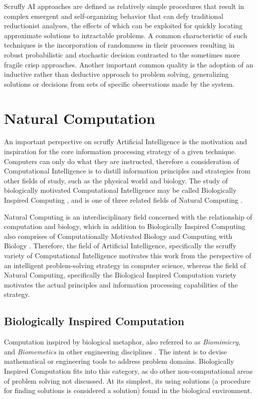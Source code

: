 \documentclass[a4paper, 11pt]{article}
\begin{document}
Scruffy AI approaches are defined as relatively simple procedures that result in complex emergent and self-organizing behavior that can defy traditional reductionist analyses, the effects of which can be exploited for quickly locating approximate solutions to intractable problems. A common characteristic of such techniques is the incorporation of randomness in their processes resulting in robust probabilistic and stochastic decision contrasted to the sometimes more fragile crisp approaches. Another important common quality is the adoption of an inductive rather than deductive approach to problem solving, generalizing solutions or decisions from sets of specific observations made by the system.

% 
% 
\section{Natural Computation}
\label{sec:natural_computation}
An important perspective on scruffy Artificial Intelligence is the motivation and inspiration for the core information processing strategy of a given technique. Computers can only do what they are instructed, therefore a consideration of Computational Intelligence is to distill information principles and strategies from other fields of study, such as the physical world and biology. The study of biologically motivated Computational Intelligence may be called Biologically Inspired Computing \cite{Castro2005a}, and is one of three related fields of Natural Computing \cite{Forbes2000, Forbes2005, Paton1994}. 

Natural Computing is an interdisciplinary field concerned with the relationship of computation and biology, which in addition to Biologically Inspired Computing also comprises of Computationally Motivated Biology and Computing with Biology \cite{Paun2005, Marrow2000}. Therefore, the field of Artificial Intelligence, specifically the scruffy variety of Computational Intelligence motivates this work from the perspective of an intelligent problem-solving strategy in computer science, whereas the field of Natural Computing, specifically the Biological Inspired Computation variety motivates the actual principles and information processing capabilities of the strategy.

\subsection{Biologically Inspired Computation}
Computation inspired by biological metaphor, also referred to as \emph{Biomimicry}, and \emph{Biomemetics} in other engineering disciplines \cite{Castro2005, Benyus1998}. The intent is to devise mathematical or engineering tools to address problem domains. Biologically Inspired Computation fits into this category, as do other non-computational areas of problem solving not discussed. At its simplest, its using solutions (a procedure for finding solutions is considered a solution) found in the biological environment.
\end{document}
